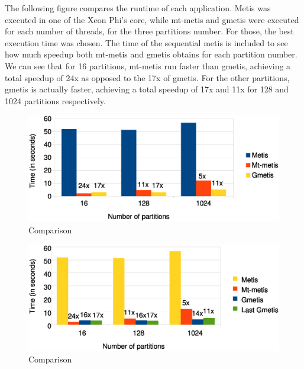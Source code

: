 \documentclass[abstract=on,9pt,twocolumn]{scrartcl}
\begin{document}

The following figure compares the runtime of each application. Metis was
executed in one of the Xeon Phi's core, while mt-metis and gmetis were executed
for each number of threads, for the three partitions number. For those, the best execution time was
chosen. The time of the sequential metis is included to see how much
speedup both mt-metis and gmetis obtains for each partition number. 
We can see that for 16 partitions, mt-metis run faster than gmetis,
achieving a total speedup of 24x as opposed to the 17x of gmetis.
For the other partitions, gmetis is actually faster, achieving a total
speedup of 17x and 11x for 128 and 1024 partitions respectively.




\begin{center}
\begin{figure}[htb]
    \includegraphics[width=\columnwidth]{img/comparison3.eps}
    \caption{Comparison}
    \label{img:comparison3}
\end{figure}
\end{center}

\begin{center}
\begin{figure}[htb]
    \includegraphics[width=\columnwidth]{img/comparison4.eps}
    \caption{Comparison}
    \label{img:comparison4}
\end{figure}
\end{center}
\end{document}
